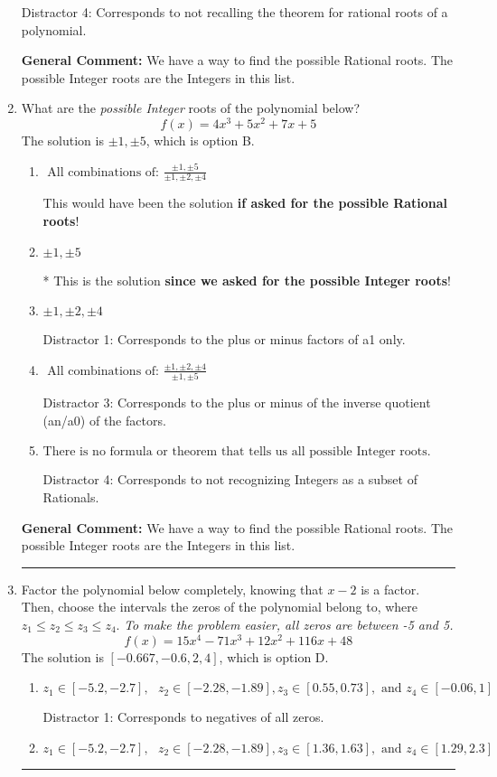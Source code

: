 \documentclass{extbook}[14pt]
\newcommand{\litem}[1]{\item #1

\rule{\textwidth}{0.4pt}}
\begin{document}
\begin{enumerate}
{\begin{enumerate}[label=\Alph*.]
 Distractor 4: Corresponds to not recalling the theorem for rational roots of a polynomial.
\end{enumerate}

\textbf{General Comment:} We have a way to find the possible Rational roots. The possible Integer roots are the Integers in this list.
}
\litem{
What are the \textit{possible Integer} roots of the polynomial below?
\[ f(x) = 4x^{3} +5 x^{2} +7 x + 5 \]The solution is \( \pm 1,\pm 5 \), which is option B.\begin{enumerate}[label=\Alph*.]
\item \( \text{ All combinations of: }\frac{\pm 1,\pm 5}{\pm 1,\pm 2,\pm 4} \)

This would have been the solution \textbf{if asked for the possible Rational roots}!
\item \( \pm 1,\pm 5 \)

* This is the solution \textbf{since we asked for the possible Integer roots}!
\item \( \pm 1,\pm 2,\pm 4 \)

 Distractor 1: Corresponds to the plus or minus factors of a1 only.
\item \( \text{ All combinations of: }\frac{\pm 1,\pm 2,\pm 4}{\pm 1,\pm 5} \)

 Distractor 3: Corresponds to the plus or minus of the inverse quotient (an/a0) of the factors. 
\item \( \text{There is no formula or theorem that tells us all possible Integer roots.} \)

 Distractor 4: Corresponds to not recognizing Integers as a subset of Rationals.
\end{enumerate}

\textbf{General Comment:} We have a way to find the possible Rational roots. The possible Integer roots are the Integers in this list.
}
\litem{
Factor the polynomial below completely, knowing that $x -2$ is a factor. Then, choose the intervals the zeros of the polynomial belong to, where $z_1 \leq z_2 \leq z_3 \leq z_4$. \textit{To make the problem easier, all zeros are between -5 and 5.}
\[ f(x) = 15x^{4} -71 x^{3} +12 x^{2} +116 x + 48 \]The solution is \( [-0.667, -0.6, 2, 4] \), which is option D.\begin{enumerate}[label=\Alph*.]
\item \( z_1 \in [-5.2, -2.7], \text{   }  z_2 \in [-2.28, -1.89], z_3 \in [0.55, 0.73], \text{   and   } z_4 \in [-0.06, 1] \)

 Distractor 1: Corresponds to negatives of all zeros.
\item \( z_1 \in [-5.2, -2.7], \text{   }  z_2 \in [-2.28, -1.89], z_3 \in [1.36, 1.63], \text{   and   } z_4 \in [1.29, 2.3] \)


\end{enumerate}}
\end{enumerate}
\end{document}
